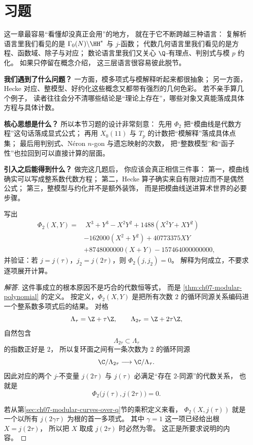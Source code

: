\section{习题}
\label{sec:ch07-exercises}

这一章最容易“看懂却没真正会用”的地方，
就在于它不断跨越三种语言：
复解析语言里我们看见的是 $\Gamma_0(N)\backslash\HH^*$ 与 $j$-函数；
代数几何语言里我们看见的是方程、函数域、除子与对应；
数论语言里我们又关心 $\Q$-有理点、判别式与模 $p$ 约化。
如果只停留在概念介绍，
这三层语言很容易彼此脱节。

\textbf{我们遇到了什么问题？}
一方面，模多项式与模解释听起来都很抽象；
另一方面，Hecke 对应、整模型、好约化这些概念又都带有强烈的几何色彩。
若不亲手算几个例子，
读者往往会分不清哪些结论是“理论上存在”，哪些对象又真能落成具体方程与具体计数。

\textbf{核心思想是什么？}
所以本节习题的设计非常刻意：
先用 $\Phi_2$ 把“模曲线是代数方程”这句话落成显式公式；
再用 $X_0(11)$ 与 $T_p$ 的计数把“模解释”落成具体点集；
最后用判别式、N\'eron $n$-gon 与遗忘映射的次数，
把“整数模型”和“函子性”也拉回到可以直接计算的层面。

\textbf{引入之后能得到什么？}
做完这几题后，
你应该会真正相信三件事：
第一，模曲线确实可以写成整系数代数方程；
第二，Hecke 算子确实来自有限对应而不是偶然公式；
第三，整模型与约化并不是额外装饰，
而是把模曲线送进算术世界的必要步骤。



\begin{exercise}
\label{ex:ch07-phi2}
写出
\[
\begin{aligned}
\Phi_2(X,Y)=&\ X^3+Y^3-X^2Y^2+1488(X^2Y+XY^2)\\
&-162000(X^2+Y^2)+40773375XY\\
&+8748000000(X+Y)-157464000000000,
\end{aligned}
\]
并验证：若 $j=j(\tau)$，$j_2=j(2\tau)$，则 $\Phi_2(j,j_2)=0$。
解释为何成立，不要求逐项展开计算。
\end{exercise}

\begin{proof}[解答]
这件事成立的根本原因不是巧合的代数恒等式，
而是 \cref{thm:ch07-modular-polynomial} 的定义。
按定义，$\Phi_2(X,Y)$ 是把所有次数 $2$ 的循环同源关系编码进一个整系数多项式后的结果。
对格
\[
  \Lambda_\tau=\Z+\tau\Z,
  \qquad
  \Lambda_{2\tau}=\Z+2\tau\Z,
\]
自然包含
\[
  \Lambda_{2\tau}\subset \Lambda_\tau
\]
的指数正好是 $2$，
所以复环面之间有一条次数为 $2$ 的循环同源
\[
  \C/\Lambda_{2\tau}\longrightarrow \C/\Lambda_\tau.
\]
因此对应的两个 $j$-不变量 $j(2\tau)$ 与 $j(\tau)$ 必满足“存在 $2$-同源”的代数关系，
也就是
\[
  \Phi_2\bigl(j(\tau),j(2\tau)\bigr)=0.
\]

若从第\ref{sec:ch07-modular-curves-over-q}节的乘积定义来看，
$\Phi_2(X,j(\tau))$ 就是一个以所有 $j(2\gamma\tau)$ 为根的首一多项式。
其中 $\gamma=1$ 这一项已经给出根 $X=j(2\tau)$，
所以把 $X$ 取成 $j(2\tau)$ 时必然为零。
这正是所要求说明的内容。
\end{proof}


